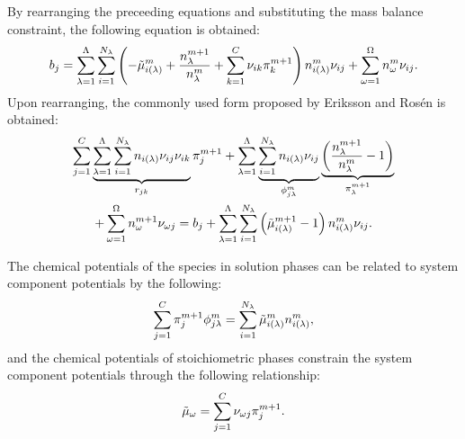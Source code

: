 By rearranging the preceeding equations and substituting the mass balance constraint, the following equation is obtained:
\begin{equation}
  \moleelem{j} = \sumsolnphase \sumspecies \left(-\cps{i}^m + \frac{\molesol^{m+1}}{\molesol^{m}} + \sumelements[k] \stoich{i}{k} \pi_k^{m+1} \right)\molespecies{i}^m \stoich{i}{j} + \sumstoichphase \molestoich^m\stoich{i}{j}.
\end{equation}
Upon rearranging, the commonly used form proposed by Eriksson and Ros\'{e}n \cite{Eriksson73} is obtained:
\begin{multline}\label{eq:Hess1}
  \sumelements \underbrace{\sumsolnphase \sumspecies \molespecies{i}\stoich{i}{j}\stoich{i}{k}}_{r_{jk}} \pi_j^{m+1} +
  \sumsolnphase \underbrace{\sumspecies\molespecies{i} \stoich{i}{j}}_{\phi_{j\lambda}^m} \underbrace{\left(\frac{\molesol^{m+1}}{\molesol^{m}} - 1\right)}_{\pi_\lambda^{m+1}} \\
  + \sumstoichphase \molestoich^{m+1} \stoich{\omega}{j} =
  \moleelem{j} + \sumsolnphase \sumspecies \left(\cps{i}^{m+1} -1 \right)\molespecies{i}^{m} \stoich{i}{j}.
\end{multline}

The chemical potentials of the species in solution phases can be related to system component potentials by the following:
\begin{equation}\label{eq:Hess2}
  \sumelements \pi_j^{m+1} \phi_{j \lambda}^m = \sumspecies \cps{i}^m \molespecies{i}^m,
\end{equation}
and the chemical potentials of stoichiometric phases constrain the system component potentials through the following relationship:
\begin{equation}\label{eq:Hess3}
  \cpst = \sumelements\stoich{\omega}{j}\pi_j^{m+1}.
\end{equation}

